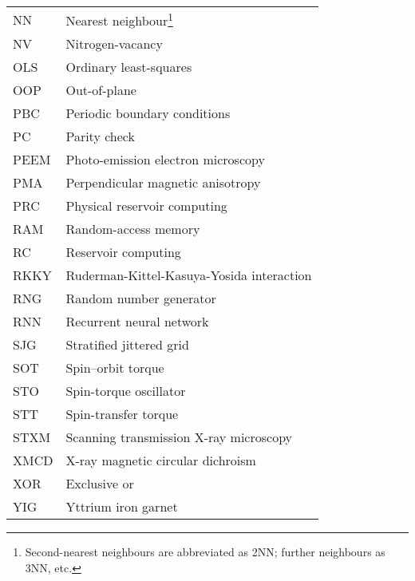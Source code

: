 {\begin{longtable}[l]{ll}
        NN    & Nearest neighbour\footnote{Second-nearest neighbours are abbreviated as 2NN; further neighbours as 3NN, etc.} \\
        NV    & Nitrogen-vacancy                            \\
        OLS   & Ordinary least-squares                      \\
        OOP   & Out-of-plane                                \\
        PBC   & Periodic boundary conditions                \\
        PC    & Parity check                                \\
        PEEM  & Photo-emission electron microscopy          \\
        PMA   & Perpendicular magnetic anisotropy           \\
        PRC   & Physical reservoir computing                \\
        RAM   & Random-access memory                        \\
        RC    & Reservoir computing                         \\
        RKKY  & Ruderman-Kittel-Kasuya-Yosida interaction   \\
        RNG   & Random number generator                     \\
        RNN   & Recurrent neural network                    \\
        SJG   & Stratified jittered grid                    \\
        SOT   & Spin--orbit torque                           \\
        STO   & Spin-torque oscillator                      \\
        STT   & Spin-transfer torque                        \\
        STXM  & Scanning transmission X-ray microscopy      \\
        XMCD  & X-ray magnetic circular dichroism           \\
        XOR   & Exclusive or                                \\
        YIG   & Yttrium iron garnet                         \\
    \end{longtable}
}
